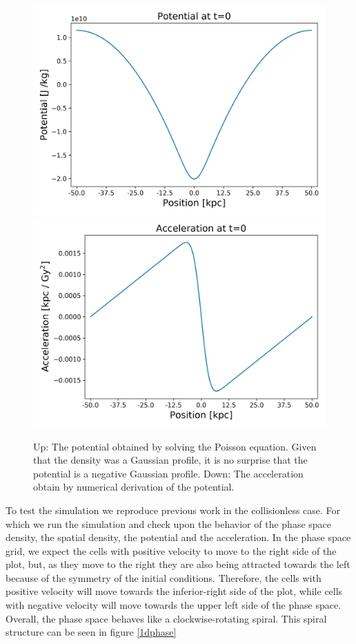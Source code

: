 \begin{figure}[h!]
    \centering
    \includegraphics[scale=0.6]{imag/1dInitPot.png}
    \includegraphics[scale=0.6]{imag/1dInitAcce.png}
    \caption{Up: The potential obtained by solving the Poisson equation. Given that the density was a Gaussian profile, it is no surprise that the potential is a negative Gaussian profile. Down: The acceleration obtain by numerical derivation of the potential.}
    \label{1dInit2}
\end{figure}

To test the simulation we reproduce previous work in the collisionless case. For which we run the simulation and check upon the behavior of the phase space density, the spatial density, the potential and the acceleration. 
In the phase space grid, we expect the cells with positive velocity to move to the right side of the plot, but, as they move to the right they are also being attracted towards the left because of the symmetry of the initial conditions. Therefore, the cells with positive velocity will move towards the inferior-right side of the plot, while cells with negative velocity will move towards the upper left side of the phase space. Overall, the phase space behaves like a clockwise-rotating spiral. This spiral structure can be seen in figure \ref{1dphase}


